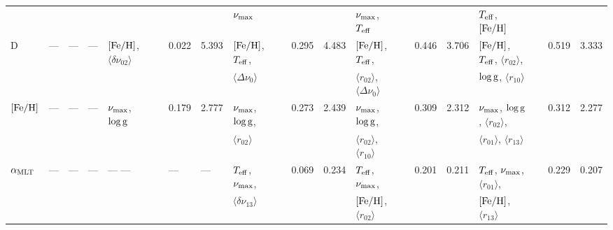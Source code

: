 {\begin{landscape}
\begin{table}
\begin{tabular}{  l | l  l  l | l  l  l  l | l  l  l  l | l  l  l  l | l  l  l  l   }
  &  &  &  &  &  &  &  &  $\nu_{\rm{max}}$ &  &  &  & $\nu_{\rm{max}}$, $T_{\rm{eff}}$ &&  & & $T_{\rm{eff}}$, $[\rm{Fe/H}]$ &  &  &\\[3pt] 
   D & --- & --- & --- & $[\rm{Fe/H}]$, $\langle\delta\nu_{02}\rangle$ && 0.022 & 5.393 & $[\rm{Fe/H}]$, $T_{\rm{eff}}$, && 0.295 & 4.483 & $[\rm{Fe/H}]$, $T_{\rm{eff}}$, && 0.446 & 3.706 & $[\rm{Fe/H}]$,  $T_{\rm{eff}}$, $\langle r_{02}\rangle$, && 0.519 & 3.333\\
  &  &  &  &  &  &  &  &  $\langle\Delta\nu_0\rangle$ &  &  &  & $\langle r_{02}\rangle$, $\langle\Delta\nu_0\rangle$ &&  & & $\log \rm{g}$, $\langle r_{10}\rangle$ &  &  &\\[3pt] 
  $[\rm{Fe/H}]$ &--- & --- & --- & $\nu_{\rm{max}}$, $\log \rm{g}$ && 0.179 & 2.777 & $\nu_{\rm{max}}$, $\log \rm{g}$, && 0.273 & 2.439 & $\nu_{\rm{max}}$, $\log \rm{g}$, && 0.309 & 2.312 & $\nu_{\rm{max}}$, $\log \rm{g}$, $\langle r_{02}\rangle$, && 0.312 & 2.277\\
  &  &  &  &  &  &  &  &  $\langle r_{02}\rangle$ &  &  &  & $\langle r_{02}\rangle$, $\langle r_{10}\rangle$ &&  & & $\langle r_{01}\rangle$, $\langle r_{13}\rangle$ &  &  &\\[3pt] 
  $\alpha_{\rm{MLT}}$ & --- & --- & --- & --- --- && --- & --- & $T_{\rm{eff}}$, $\nu_{\rm{max}}$, && 0.069 & 0.234 & $T_{\rm{eff}}$, $\nu_{\rm{max}}$, && 0.201 & 0.211 & $T_{\rm{eff}}$, $\nu_{\rm{max}}$, $\langle r_{01}\rangle$, && 0.229 & 0.207\\
  &  &  &  &  &  &  &  &  $\langle\delta\nu_{13}\rangle$ &  &  &  & $[\rm{Fe/H}]$, $\langle r_{02}\rangle$ &&  & & $[\rm{Fe/H}]$, $\langle r_{13}\rangle$ &  &  &\\[3pt] 
 \end{tabular} 
 \end{table}
\end{landscape}
}

